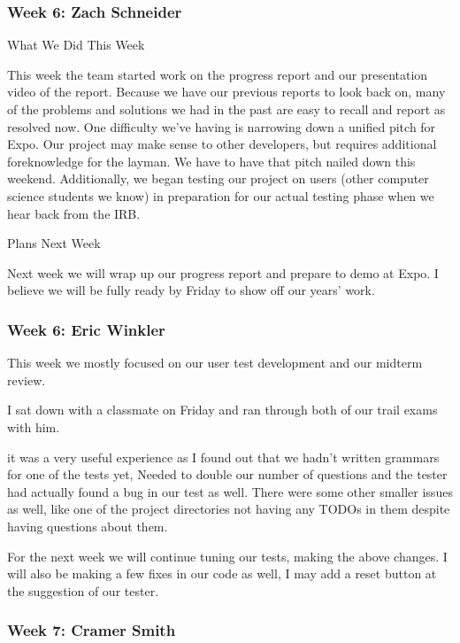  \subsubsection{Week 6: Zach Schneider}

What We Did This Week

This week the team started work on the progress report and our presentation video of the report. Because we have our previous reports to look back on, many of the problems and solutions we had in the past are easy to recall and report as resolved now. One difficulty we've having is narrowing down a unified pitch for Expo. Our project may make sense to other developers, but requires additional foreknowledge for the layman. We have to have that pitch nailed down this weekend. Additionally, we began testing our project on users (other computer science students we know) in preparation for our actual testing phase when we hear back from the IRB.



Plans Next Week

Next week we will wrap up our progress report and prepare to demo at Expo. I believe we will be fully ready by Friday to show off our years' work. \\ 

 \subsubsection{Week 6: Eric Winkler}

This week we mostly focused on our user test development and our midterm review.



I sat down with a classmate on Friday and ran through both of our trail exams with him. 

it was a very useful experience as I found out that we hadn't written grammars for one of the tests yet, Needed to double our number of questions and the tester had actually found a bug in our test as well. There were some other smaller issues as well, like one of the project directories not having any TODOs in them despite having questions about them.



For the next week we will continue tuning our tests, making the above changes. I will also be making a few fixes in our code as well, I may add a reset button at the suggestion of our tester. \\ 

 \subsubsection{Week 7: Cramer Smith}


